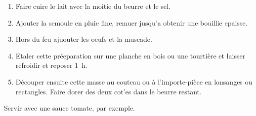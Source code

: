 
\begin{ingredients}
\end{ingredients}


\begin{recipe}
  \begin{enumerate}

  \item Faire cuire le lait avec la moitie du beurre et le sel.

  \item Ajouter la semoule en pluie fine, remuer jusqu'a obtenir une
    bouillie epaisse.

  \item Hors du feu ajuouter les oeufs et la muscade.

  \item Etaler cette pr\'eeparation sur une planche en bois ou une
    tourti\`ere et laisser refroidir et reposer 1~h.

  \item D\'ecouper ensuite cette masse au couteau ou \`a
    l'importe-pi\`ece en lonsanges ou rectangles.  Faire dorer des
    deux cot'es dans le beurre restant.

  \end{enumerate}

  Servir avec une sauce tomate, par exemple.
\end{recipe}

